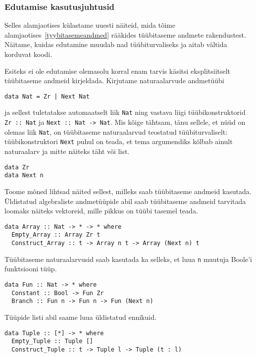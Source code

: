 \documentclass[12pt]{article}
\begin{document}
      \subsubsection{Edutamise kasutusjuhtusid}
        Selles alamjaotises külastame uuesti näiteid, mida tõime alamjaotises~\ref{tyybitasemeandmed} rääkides tüübitaseme andmete rakendustest. Näitame, kuidas edutamine muudab nad tüübiturvaliseks ja aitab vältida korduvat koodi.

        Esiteks ei ole edutamise olemasolu korral enam tarvis käsitsi eksplitsiitselt tüübitaseme andmeid kirjeldada. Kirjutame naturaalarvude andmetüübi

        \begin{verbatim}data Nat = Zr | Next Nat\end{verbatim}

        ja sellest tuletatakse automaatselt liik \verb!Nat! ning vastava liigi tüübikonstruktorid \verb!Zr :: Nat! ja \verb!Next :: Nat -> Nat!. Mis kõige tähtsam, tänu sellele, et nüüd on olemas liik \verb!Nat!, on tüübitaseme naturaalarvud teostatud tüübiturvaliselt: tüübikonstruktori \verb!Next! puhul on teada, et tema argumendiks kõlbab ainult naturaalarv ja mitte näiteks täht või list.

      \begin{verbatim}data Zr
data Next n\end{verbatim}

      Toome mõned lihtsad näited sellest, milleks saab tüübitaseme andmeid kasutada. Üldistatud algebraliste andmetüüpide abil saab tüübitaseme andmeid tarvitada loomaks näiteks vektoreid, mille pikkus on tüübi tasemel teada.

      \begin{verbatim}data Array :: Nat -> * -> * where
  Empty_Array :: Array Zr t
  Construct_Array :: t -> Array n t -> Array (Next n) t\end{verbatim}

      Tüübitaseme naturaalarvusid saab kasutada ka selleks, et luua \verb!n! muutuja Boole'i funktsiooni tüüp.

      \begin{verbatim}data Fun :: Nat -> * where
  Constant :: Bool -> Fun Zr
  Branch :: Fun n -> Fun n -> Fun (Next n)\end{verbatim}

      Tüüpide listi abil saame luua üldistatud ennikuid.

      \begin{verbatim}data Tuple :: [*] -> * where
  Empty_Tuple :: Tuple []
  Construct_Tuple :: t -> Tuple l -> Tuple (t : l)\end{verbatim}
\end{document}
